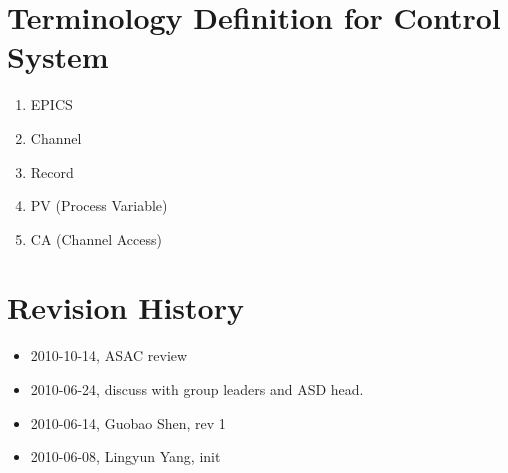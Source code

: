 \documentclass[letterpaper,showtrims]{memoir}
\begin{document}
\section{Terminology Definition for Control System\label{sec:cs:terminology}}

\begin{enumerate}
\item EPICS
\item Channel
\item Record
\item PV (Process Variable)
\item CA (Channel Access)
\end{enumerate}

\section{Revision History}

\begin{itemize}
\item  2010-10-14, ASAC review
\item  2010-06-24, discuss with group leaders and ASD head.
\item  2010-06-14, Guobao Shen, rev 1
\item  2010-06-08, Lingyun Yang, init
\end{itemize}
\end{document}
